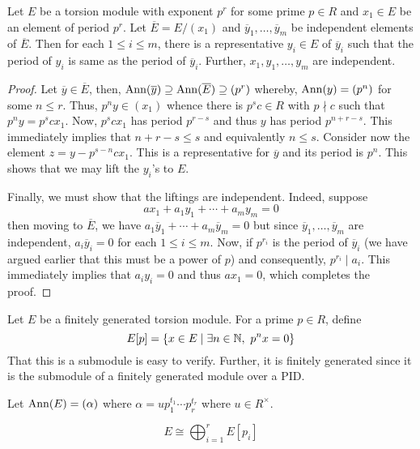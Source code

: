 \begin{lemma}
    Let $E$ be a torsion module with exponent $p^r$ for some prime $p\in R$ and $x_1\in E$ be an element of period $p^r$. Let $\overline E = E/(x_1)$ and $\overline y_1,\ldots,\overline y_m$ be independent elements of $\overline E$. Then for each $1\le i\le m$, there is a representative $y_i\in E$ of $\overline y_i$ such that the period of $y_i$ is same as the period of $\overline y_i$. Further, $x_1,y_1,\ldots,y_m$ are independent.
\end{lemma}
\begin{proof}
    Let $\overline y\in\overline E$, then, $\operatorname{Ann}(\overline y)\supseteq\operatorname{Ann}(\overline E)\supseteq(p^r)$ whereby, $\operatorname{Ann}(y) = (p^n)$ for some $n\le r$. Thus, $p^n y \in (x_1)$ whence there is $p^sc\in R$ with $p\nmid c$ such that $p^ny = p^sc x_1$. Now, $p^scx_1$ has period $p^{r - s}$ and thus $y$ has period $p^{n + r - s}$. This immediately implies that $n + r - s\le s$ and equivalently $n\le s$. Consider now the element $z = y - p^{s - n}cx_1$. This is a representative for $\overline y$ and its period is $p^n$. This shows that we may lift the $y_i$'s to $E$.

    Finally, we must show that the liftings are independent. Indeed, suppose 
    \begin{equation*}
        ax_1 + a_1y_1 + \cdots + a_my_m = 0
    \end{equation*}
    then moving to $\overline{E}$, we have $a_1\overline y_1 + \cdots + a_m\overline y_m = 0$ but since $\overline y_1,\ldots,\overline y_m$ are independent, $a_i\overline y_i = 0$ for each $1\le i\le m$. Now, if $p^{r_i}$ is the period of $\overline y_i$ (we have argued earlier that this must be a power of $p$) and consequently, $p^{r_i}\mid a_i$. This immediately implies that $a_iy_i = 0$ and thus $ax_1 = 0$, which completes the proof.
\end{proof}

Let $E$ be a finitely generated torsion module. For a prime $p\in R$, define
\begin{equation*}
    E[p] = \{x\in E\mid\exists n\in\mathbb{N},~p^nx = 0\}
\end{equation*}
That this is a submodule is easy to verify. Further, it is finitely generated since it is the submodule of a finitely generated module over a PID. 

Let $\operatorname{Ann}(E) = (\alpha)$ where $\alpha = up_1^{t_1}\cdots p_r^{t_r}$ where $u\in R^\times$.

\begin{lemma}
    \begin{equation*}
        E\cong\bigoplus_{i = 1}^r E[p_i]
    \end{equation*}
\end{lemma}


